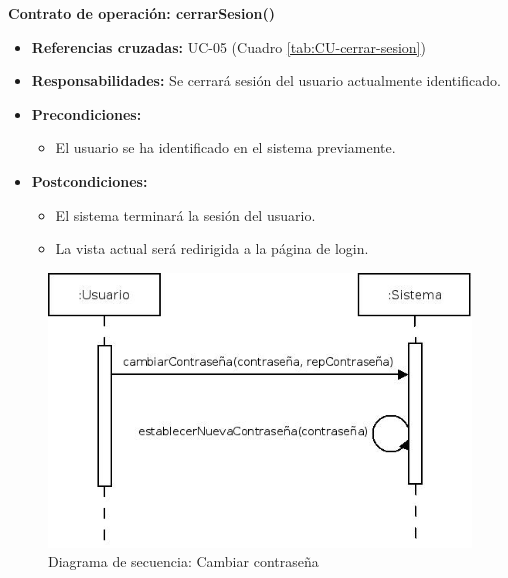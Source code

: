\textbf{Contrato de operación: cerrarSesion()}
\begin{itemize}
\item \textbf{Referencias cruzadas:} UC-05 (Cuadro \ref{tab:CU-cerrar-sesion})
\item \textbf{Responsabilidades:} Se cerrará sesión del usuario actualmente identificado.
\item \textbf{Precondiciones:} 
 \begin{itemize}
\item El usuario se ha identificado en el sistema previamente.
\end {itemize}
\item \textbf{Postcondiciones:} 
 \begin{itemize}
\item El sistema terminará la sesión del usuario.
\item La vista actual será redirigida a la página de login.
\end {itemize}
\end {itemize}


\vspace{7mm}
\dotfill
\vspace{7mm}

\begin{figure}[h!]
\centering
  \includegraphics[scale=.55]{img/secuencias/gestion-usuarios-cambiar-contrasena.jpeg}
  \caption{Diagrama de secuencia: Cambiar contraseña}
  \label{fig:secuencia-gestion-usuarios-cambiar-contrasena}
\end{figure}

